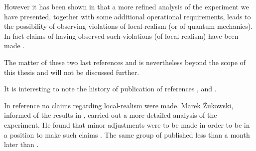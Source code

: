 However it has been shown in \cite{PhysRevA.61.022109} that a more refined analysis of the experiment we have presented, together with some additional operational requirements, leads to the possibility of observing violations of local-realism (or of quantum mechanics). In fact claims of having observed such violations (of local-realism) have been made \cite{Nature.403.515}.

The matter of these two last references \cite{PhysRevA.61.022109} and \cite{Nature.403.515} is nevertheless beyond the scope of this thesis and will not be discussed further.

\begin{note}
  It is interesting to note the history of publication of references \cite{PhysRevLett.82.1345}, \cite{PhysRevA.61.022109} and \cite{Nature.403.515}.

  In reference \cite{PhysRevLett.82.1345} no claims regarding local-realism were made. Marek \.{Z}ukowski, informed of the results in \cite{PhysRevLett.82.1345}, carried out a more detailed analysis of the experiment. He found that minor adjustments were to be made in order to be in a position to make such claims \cite{PhysRevA.61.022109}. The same group of \cite{PhysRevLett.82.1345} published \cite{Nature.403.515} less than a month later than \cite{PhysRevA.61.022109}.
\end{note}
